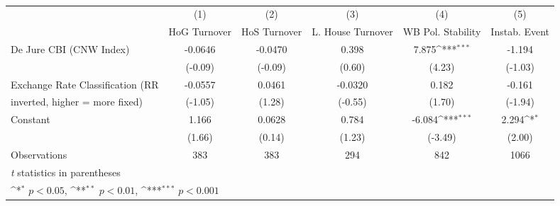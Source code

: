 \begin{table}[htbp]\centering
\def\sym#1{\ifmmode^{#1}\else\(^{#1}\)\fi}
\caption{\label{lowKIfivs}}
\begin{tabular}{l*{5}{c}}
\toprule
                                        &\multicolumn{1}{c}{(1)}&\multicolumn{1}{c}{(2)}&\multicolumn{1}{c}{(3)}&\multicolumn{1}{c}{(4)}&\multicolumn{1}{c}{(5)}\\
                                        &\multicolumn{1}{c}{HoG Turnover}&\multicolumn{1}{c}{HoS Turnover}&\multicolumn{1}{c}{L. House Turnover}&\multicolumn{1}{c}{WB Pol. Stability}&\multicolumn{1}{c}{Instab. Event}\\
\midrule
De Jure CBI (CNW Index)                 &  -0.0646         &  -0.0470         &    0.398         &    7.875\sym{***}&   -1.194         \\
                                        &  (-0.09)         &  (-0.09)         &   (0.60)         &   (4.23)         &  (-1.03)         \\
\addlinespace
Exchange Rate Classification (RR        &  -0.0557         &   0.0461         &  -0.0320         &    0.182         &   -0.161         \\
inverted, higher = more fixed)          &  (-1.05)         &   (1.28)         &  (-0.55)         &   (1.70)         &  (-1.94)         \\
\addlinespace
Constant                                &    1.166         &   0.0628         &    0.784         &   -6.084\sym{***}&    2.294\sym{*}  \\
                                        &   (1.66)         &   (0.14)         &   (1.23)         &  (-3.49)         &   (2.00)         \\
\midrule
Observations                            &      383         &      383         &      294         &      842         &     1066         \\
\bottomrule
\multicolumn{6}{l}{\footnotesize \textit{t} statistics in parentheses}\\
\multicolumn{6}{l}{\footnotesize \sym{*} \(p<0.05\), \sym{**} \(p<0.01\), \sym{***} \(p<0.001\)}\\
\end{tabular}
\end{table}
